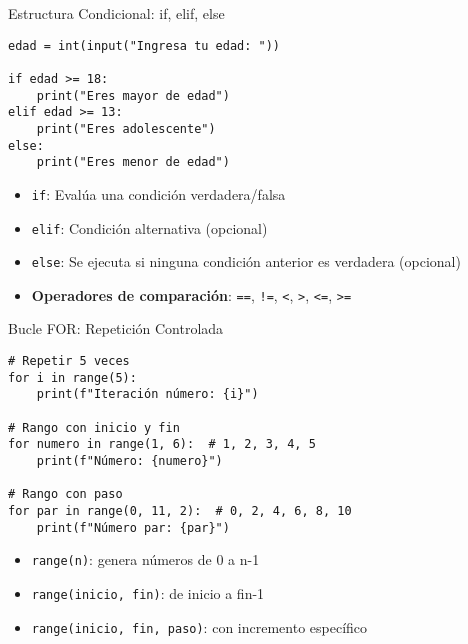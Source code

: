 \documentclass[10pt]{beamer}
\begin{document}
\begin{frame}[fragile]{Estructura Condicional: if, elif, else}
\begin{verbatim}
edad = int(input("Ingresa tu edad: "))

if edad >= 18:
    print("Eres mayor de edad")
elif edad >= 13:
    print("Eres adolescente")
else:
    print("Eres menor de edad")
\end{verbatim}
\begin{itemize}
  \item \texttt{if}: Evalúa una condición verdadera/falsa
  \item \texttt{elif}: Condición alternativa (opcional)
  \item \texttt{else}: Se ejecuta si ninguna condición anterior es verdadera (opcional)
  \item \textbf{Operadores de comparación}: \texttt{==}, \texttt{!=}, \texttt{<}, \texttt{>}, \texttt{<=}, \texttt{>=}
\end{itemize}
\end{frame}

\begin{frame}[fragile]{Bucle FOR: Repetición Controlada}
\begin{verbatim}
# Repetir 5 veces
for i in range(5):
    print(f"Iteración número: {i}")

# Rango con inicio y fin
for numero in range(1, 6):  # 1, 2, 3, 4, 5
    print(f"Número: {numero}")

# Rango con paso
for par in range(0, 11, 2):  # 0, 2, 4, 6, 8, 10
    print(f"Número par: {par}")
\end{verbatim}
\begin{itemize}
  \item \texttt{range(n)}: genera números de 0 a n-1
  \item \texttt{range(inicio, fin)}: de inicio a fin-1
  \item \texttt{range(inicio, fin, paso)}: con incremento específico
\end{itemize}
\end{frame}
\end{document}
